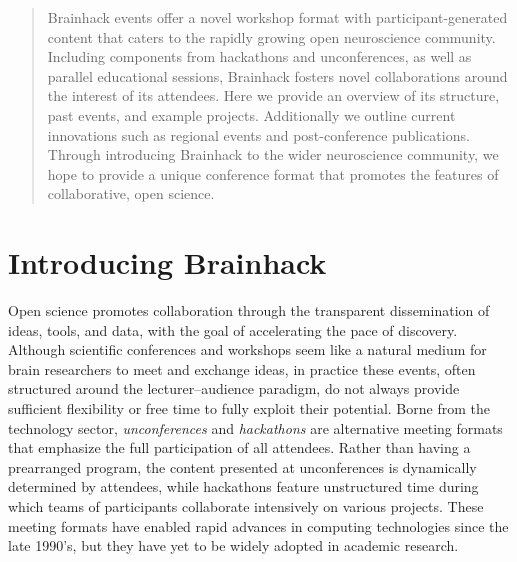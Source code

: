 \documentclass[11pt]{bmc_article_s50}
\begin{document}
\begin{abstract} %
Brainhack events offer a novel workshop format with participant-generated content that caters to the rapidly growing open neuroscience community. Including components from hackathons and unconferences, as well as parallel educational sessions, Brainhack fosters novel collaborations around the interest of its attendees. Here we provide an overview of its structure, past events, and example projects. Additionally we outline current innovations such as regional events and post-conference publications. Through introducing Brainhack to the wider neuroscience community, we hope to provide a unique conference format that promotes the features of collaborative, open science.

\end{abstract}


\section{Introducing Brainhack}

Open science promotes collaboration through the transparent dissemination of ideas, tools, and data, with the goal of accelerating the pace of discovery. Although scientific conferences and workshops seem like a natural medium for brain researchers to meet and exchange ideas, in practice these events, often structured around the lecturer--audience paradigm, do not always provide sufficient flexibility or free time to fully exploit their potential. Borne from the technology sector, \emph{unconferences} and \emph{hackathons} are alternative meeting formats that emphasize the full participation of all attendees. Rather than having a prearranged program, the content presented at unconferences is dynamically determined by attendees, 
while hackathons feature unstructured time during which teams of participants collaborate intensively on various projects. These meeting formats have enabled rapid advances in computing technologies since the late 1990's, but they have yet to be widely adopted in academic research. 
\end{document}
